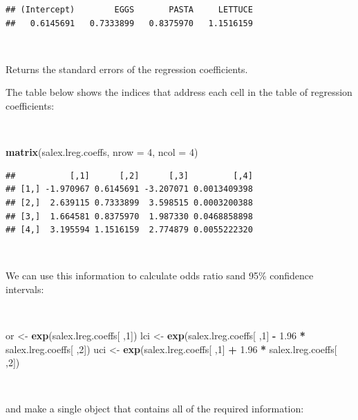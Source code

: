 \documentclass[12pt,a4paper]{book}
\newenvironment{Shaded}{\begin{snugshade}}{\end{snugshade}}
\newcommand{\KeywordTok}[1]{\textcolor[rgb]{0.13,0.29,0.53}{\textbf{#1}}}
\newcommand{\DataTypeTok}[1]{\textcolor[rgb]{0.13,0.29,0.53}{#1}}
\newcommand{\DecValTok}[1]{\textcolor[rgb]{0.00,0.00,0.81}{#1}}
\newcommand{\FloatTok}[1]{\textcolor[rgb]{0.00,0.00,0.81}{#1}}
\newcommand{\StringTok}[1]{\textcolor[rgb]{0.31,0.60,0.02}{#1}}
\newcommand{\OperatorTok}[1]{\textcolor[rgb]{0.81,0.36,0.00}{\textbf{#1}}}
\newcommand{\NormalTok}[1]{#1}
\theoremstyle{definition}
\theoremstyle{definition}
\theoremstyle{definition}
\theoremstyle{remark}
\begin{document}
\begin{verbatim}
## (Intercept)        EGGS       PASTA     LETTUCE 
##   0.6145691   0.7333899   0.8375970   1.1516159
\end{verbatim}

~

Returns the standard errors of the regression coefficients.

The table below shows the indices that address each cell in the table of
regression coefficients:

~

\begin{Shaded}
\begin{Highlighting}[]
\KeywordTok{matrix}\NormalTok{(salex.lreg.coeffs, }\DataTypeTok{nrow =} \DecValTok{4}\NormalTok{, }\DataTypeTok{ncol =} \DecValTok{4}\NormalTok{)}
\end{Highlighting}
\end{Shaded}

\begin{verbatim}
##           [,1]      [,2]      [,3]         [,4]
## [1,] -1.970967 0.6145691 -3.207071 0.0013409398
## [2,]  2.639115 0.7333899  3.598515 0.0003200388
## [3,]  1.664581 0.8375970  1.987330 0.0468858898
## [4,]  3.195594 1.1516159  2.774879 0.0055222320
\end{verbatim}

~

We can use this information to calculate odds ratio sand 95\% confidence
intervals:

~

\begin{Shaded}
\begin{Highlighting}[]
\NormalTok{or <-}\StringTok{ }\KeywordTok{exp}\NormalTok{(salex.lreg.coeffs[ ,}\DecValTok{1}\NormalTok{])}
\NormalTok{lci <-}\StringTok{ }\KeywordTok{exp}\NormalTok{(salex.lreg.coeffs[ ,}\DecValTok{1}\NormalTok{] }\OperatorTok{-}\StringTok{ }\FloatTok{1.96} \OperatorTok{*}\StringTok{ }\NormalTok{salex.lreg.coeffs[ ,}\DecValTok{2}\NormalTok{])}
\NormalTok{uci <-}\StringTok{ }\KeywordTok{exp}\NormalTok{(salex.lreg.coeffs[ ,}\DecValTok{1}\NormalTok{] }\OperatorTok{+}\StringTok{ }\FloatTok{1.96} \OperatorTok{*}\StringTok{ }\NormalTok{salex.lreg.coeffs[ ,}\DecValTok{2}\NormalTok{])}
\end{Highlighting}
\end{Shaded}

~

and make a single object that contains all of the required information:
\end{document}
